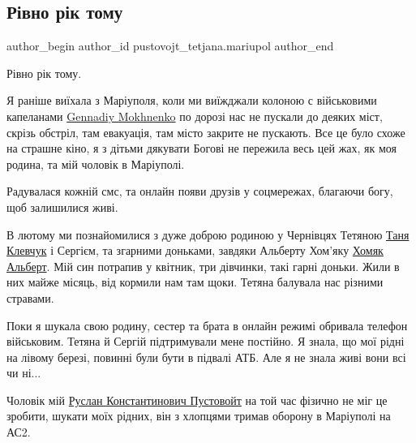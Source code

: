  
 
 
 
 

\subsection{Рівно рік тому}
\label{sec:17_03_2023.fb.pustovojt_tetjana.mariupol.1.r_vno_r_k_tomu}

\ifcmt
 author_begin
   author_id pustovojt_tetjana.mariupol
 author_end
\fi

Рівно рік тому.

Я раніше виїхала з Маріуполя, коли ми виїжджали колоною с військовими
капеланами \href{https://www.facebook.com/gennadiy.mokhnenko}{Gennadiy Mokhnenko} по дорозі нас не пускали до деяких міст, скрізь
обстріл, там евакуація, там місто закрите не пускають.  Все це було схоже на
страшне кіно, я з дітьми дякувати Богові не пережила весь цей жах, як моя
родина, та мій чоловік в Маріуполі.

Радувалася кожній смс, та онлайн появи друзів у соцмережах, благаючи богу, щоб
залишилися живі.

В лютому ми познайомилися з дуже доброю родиною у Чернівцях Тетяною \href{https://www.facebook.com/profile.php?id=100039343353211}{%
Таня Клевчук} і Сергієм, та згарними доньками, завдяки Альберту Хом'яку 
\href{https://www.facebook.com/alberthomyak}{Хомяк Альберт}. Мій син потрапив у квітник, три дівчинки, такі гарні доньки. Жили в
них майже місяць, від кормили нам там щоки. Тетяна балувала нас різними
стравами. 

Поки я шукала свою родину, сестер та брата в онлайн режимі обривала телефон
військовим. Тетяна й Сергій підтримували мене постійно. Я знала, що мої рідні
на лівому березі, повинні були бути в підвалі АТБ. Але я не знала живі вони всі
чи ні...  

Чоловік мій \href{https://www.facebook.com/paykryslan}{Руслан Константинович
Пустовойт} на той час фізично не міг це зробити, шукати моїх рідних, він з
хлопцями тримав оборону в Маріуполі на АС2. 

